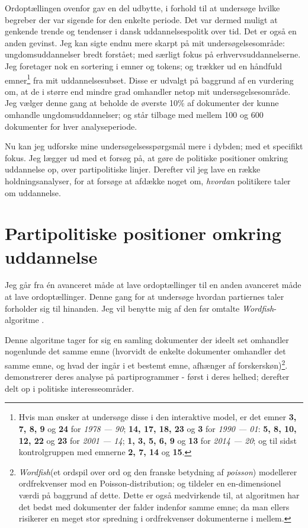 Ordoptællingen ovenfor gav en del udbytte,
i forhold til at undersøge hvilke begreber der var sigende for den enkelte periode.
Det var dermed muligt at genkende trende og tendenser i dansk uddannelsespolitk over tid.
Det er også en anden gevinst.
Jeg kan sigte endnu mere skarpt på mit undersøgelsesområde: ungdomsuddannelser bredt forstået; med særligt fokus på erhvervsuddannelserne.
Jeg foretager nok en sortering i emner og tokens; og trækker ud en håndfuld emner\footnote{
Hvis man ønsker at undersøge disse i den interaktive model, er det emner \textbf{3, 7, 8, 9} og \textbf{24} for \textit{1978 --- 90};
\textbf{14, 17, 18, 23} og \textbf{3} for \textit{1990 --- 01}:
\textbf{5, 8, 10, 12, 22} og \textbf{23} for \textit{2001 --- 14};
\textbf{1, 3, 5, 6, 9} og \textbf{13} for \textit{2014 --- 20}; 
og til sidst kontrolgruppen med emnerne \textbf{2, 7, 14} og \textbf{15}.}
fra mit uddannelsesubset.
Disse er udvalgt på baggrund af en vurdering om, at de i større end mindre grad omhandler netop mit undersøgelsesområde.
Jeg vælger denne gang at beholde de øverste 10\% af dokumenter der kunne omhandle ungdomsuddannelser; og står tilbage med mellem 100 og 600 dokumenter for hver analyseperiode.

Nu kan jeg udforske mine undersøgelsesspørgsmål mere i dybden; med et specifikt fokus.
Jeg lægger ud med et forsøg på, at gøre de politiske positioner omkring uddannelse op, over partipolitiske linjer.
Derefter vil jeg lave en række holdningsanalyser, for at forsøge at afdække noget om, \textit{hvordan} politikere taler om uddannelse. 

\section{Partipolitiske positioner omkring uddannelse}

Jeg går fra én avanceret måde at lave ordoptællinger til en anden avanceret måde at lave ordoptællinger.
Denne gang for at undersøge hvordan partiernes taler forholder sig til hinanden.
Jeg vil benytte mig af den før omtalte \textit{Wordfish}-algoritme \autocite{slapinScalingModelEstimating2008}.

Denne algoritme tager for sig en samling dokumenter der ideelt set omhandler nogenlunde det samme emne (hvorvidt de enkelte dokumenter omhandler det samme emne, og hvad der ingår i et bestemt emne, afhænger af forskerskøn)\footnote{\textit{Wordfish}(et ordspil over ord og den franske betydning af \textit{poisson}) modellerer ordfrekvenser mod en Poisson-distribution; og tildeler en en-dimensionel værdi på baggrund af dette. Dette er også medvirkende til, at algoritmen har det bedst med dokumenter der falder indenfor samme emne; da man ellers risikerer en meget stor spredning i ordfrekvenser dokumenterne i mellem.}.
\citeauthor{slapinScalingModelEstimating2008} demonstrerer deres analyse på partiprogrammer - først i deres helhed; derefter delt op i politiske interesseområder.

